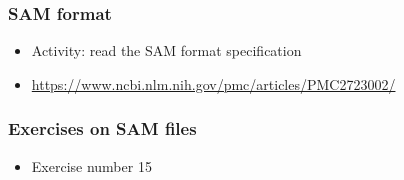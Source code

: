 \documentclass{beamer}
\begin{document}
\begin{frame}
  \frametitle{SAM format}
  \begin{itemize}
  \item Activity: read the SAM format specification
  \item \url{https://www.ncbi.nlm.nih.gov/pmc/articles/PMC2723002/}
  \end{itemize}
\end{frame}


\begin{frame}
  \frametitle{Exercises on SAM files}
  \begin{itemize}
  \item Exercise number 15
  \end{itemize}
\end{frame}















\end{document}

